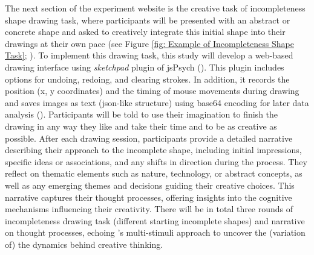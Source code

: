 \documentclass[../MA_Thesis.tex]{subfiles}
\begin{document}
The next section of the experiment website is the creative task of incompleteness shape drawing task, where participants will be presented with an abstract or concrete shape and asked to creatively integrate this initial shape into their drawings at their own pace (see Figure \ref{fig: Example of Incompleteness Shape Task}; \cite{patterson_audra_2023}). To implement this drawing task, this study will develop a web-based drawing interface using \textit{sketchpad} plugin of jsPsych (\cite{leeuw_jspsych_2023}). This plugin includes options for undoing, redoing, and clearing strokes. In addition, it records the position (x, y coordinates) and the timing of mouse movements during drawing and saves images as text (json-like structure) using base64 encoding for later data analysis (\cite{bainbridge_tutorial_2022}). Participants will be told to use their imagination to finish the drawing in any way they like and take their time and to be as creative as possible. After each drawing session, participants provide a detailed narrative describing their approach to the incomplete shape, including initial impressions, specific ideas or associations, and any shifts in direction during the process. They reflect on thematic elements such as nature, technology, or abstract concepts, as well as any emerging themes and decisions guiding their creative choices. This narrative captures their thought processes, offering insights into the cognitive mechanisms influencing their creativity. There will be in total three rounds of incompleteness drawing task (different starting incomplete shapes) and narrative on thought processes, echoing \textcite{barbot_dynamics_2018}'s multi-stimuli approach to uncover the (variation of) the dynamics behind creative thinking.
\end{document}
